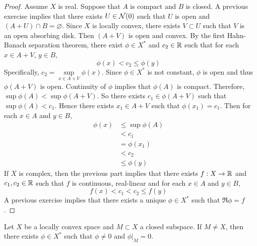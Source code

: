 \documentclass{book}
\begin{document}
	\begin{proof}
		Assume $X$ is real. Suppose that $A$ is compact and $B$ is closed. A previous exercise implies that there exists $U \in \mathcal{N}(0)$ such that $U$ is open and $(A + U) \cap B = \varnothing$. Since $X$ is locally convex, there exists $V \subset U$ such that $V$ is an open  absorbing disk. Then $(A + V)$ is open and convex. By the first Hahn-Banach separation theorem, there exist $\phi \in X^*$ and $c_2 \in \mathbb{R}$ such that for each $x \in A + V$, $y \in B$, $$\phi(x) < c_2 \leq \phi(y)$$
		Specifically, $c_2 = \sup\limits_{x \in A + V} \phi(x)$. Since $\phi \in X^*$ is not constant, $\phi$ is open and thus $\phi(A + V)$ is open. Continuity of $\phi$ implies that $\phi(A)$ is compact. Therefore, $\sup \phi(A) < \sup \phi(A + V)$. So there exists $c_1 \in \phi(A + V)$ such that $\sup \phi(A) < c_1$. Hence there exists $x_1 \in A + V$ such that $\phi(x_1) = c_1$. Then for each $x \in A$ and $y \in B$, 
		\begin{align*}
			\phi(x) 
			&\leq \sup \phi(A) \\
			&< c_1 \\
			&= \phi(x_1) \\
			&< c_2 \\
			& \leq \phi(y)
		\end{align*}
	If $X$ is complex, then the previous part implies that there exists $f:X \rightarrow \mathbb{R}$ and $c_1, c_2 \in \mathbb{R}$ such that $f$ is continuous, real-linear and for each $x \in A$ and $y \in B$, 
	$$f(x) < c_1 < c_2 \leq f(y)$$ 
	A previous exercise implies that there exists a unique $\phi \in X^*$ such that $\Re \phi = f$.
	\end{proof}


	\begin{ex}
		Let $X$ be a locally convex space and $M \subset X$ a closed subspace. If $M \neq X$, then there exists $\phi \in X^*$ such that $\phi \neq 0$ and $\phi|_M = 0$. 
	\end{ex}
\end{document}
